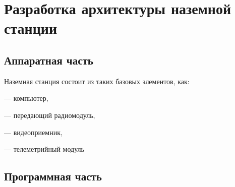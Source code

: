 
\section{Разработка архитектуры наземной станции}
\subsection{Аппаратная часть}
Наземная станция состоит из таких базовых элементов, как:

--- компьютер,

--- передающий радиомодуль,

--- видеоприемник,

--- телеметрийный модуль

\subsection{Программная часть}
